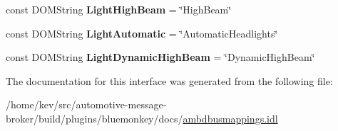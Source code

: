 \begin{DoxyCompactItemize}
\item 
\hypertarget{interfaceLightStatus_a667ffacdff37d7c6cc804bd5f2a2acd8}{const D\+O\+M\+String {\bfseries Light\+High\+Beam} = \char`\"{}High\+Beam\char`\"{}}\label{interfaceLightStatus_a667ffacdff37d7c6cc804bd5f2a2acd8}

\item 
\hypertarget{interfaceLightStatus_a64b15aee59cbc2e5d75644edbbfb8bc0}{const D\+O\+M\+String {\bfseries Light\+Automatic} = \char`\"{}Automatic\+Headlights\char`\"{}}\label{interfaceLightStatus_a64b15aee59cbc2e5d75644edbbfb8bc0}

\item 
\hypertarget{interfaceLightStatus_a401770a27e1e511566d5eaa893a24736}{const D\+O\+M\+String {\bfseries Light\+Dynamic\+High\+Beam} = \char`\"{}Dynamic\+High\+Beam\char`\"{}}\label{interfaceLightStatus_a401770a27e1e511566d5eaa893a24736}

\end{DoxyCompactItemize}


The documentation for this interface was generated from the following file\+:\begin{DoxyCompactItemize}
\item 
/home/kev/src/automotive-\/message-\/broker/build/plugins/bluemonkey/docs/\hyperlink{ambdbusmappings_8idl}{ambdbusmappings.\+idl}\end{DoxyCompactItemize}
